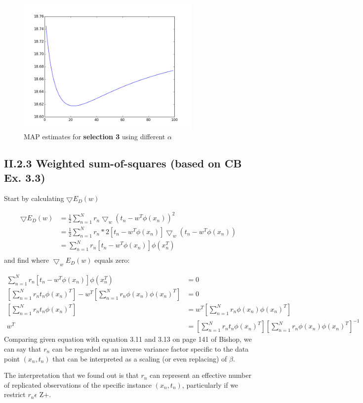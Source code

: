 \documentclass[12pt]{article}
\begin{document}
    \begin{figure}[h]
      \centering
        \includegraphics[width=0.8\textwidth]{figures/figure_II_2_2_3}
      \caption{MAP estimates for \textbf{selection 3} using different $\alpha$}
      \label{fig:map_estimate_alpha3}
    \end{figure}

  \subsection*{II.2.3 Weighted sum-of-squares (based on CB Ex. 3.3)}
  
    Start by calculating $\bigtriangledown E_D(w)$

    \begin{align*}
      \bigtriangledown E_D(w) &= \frac{1}{2} \sum\limits_{n=1}^N r_n\bigtriangledown_w (t_n - w^T\phi(x_n))^2 \\
                              &= \frac{1}{2} \sum\limits_{n=1}^N r_n * 2 [t_n - w^T\phi(x_n)] \bigtriangledown_w (t_n - w^T\phi(x_n)) \\
                              &= \sum\limits_{n=1}^N r_n [t_n - w^T\phi(x_n)]\phi(x_n^T) \\
    \end{align*}
    and find where $\bigtriangledown_wE_D(w)$ equals zero:

    \begin{align*}
      \sum\limits_{n=1}^N r_n [t_n - w^T\phi(x_n)]\phi(x_n^T) &= 0 \\
      [\sum\limits_{n=1}^N r_nt_n\phi(x_n)^T] - w^T[\sum\limits_{n=1}^N r_n\phi(x_n)\phi(x_n)^T] &= 0 \\
      [\sum\limits_{n=1}^N r_nt_n\phi(x_n)^T] &= w^T[\sum\limits_{n=1}^N r_n\phi(x_n)\phi(x_n)^T] \\
      w^T &= [\sum\limits_{n=1}^N r_nt_n\phi(x_n)^T][\sum\limits_{n=1}^N r_n\phi(x_n)\phi(x_n)^T]^{-1}
    \end{align*}
    Comparing given equation with equation 3.11 and 3.13 on page 141 of Bishop, we can say that $r_{n}$ can be regarded as an inverse variance factor specific to the data point $(x_{n}, t_{n})$ that can be interpreted as a scaling (or even replacing) of $\beta$.

    The interpretation that we found out is that $r_{n}$ can represent an effective number of replicated observations of the specific instance $(x_{n}, t_{n})$, particularly if we restrict $r_{n} \epsilon$  Z+. 
\end{document}
